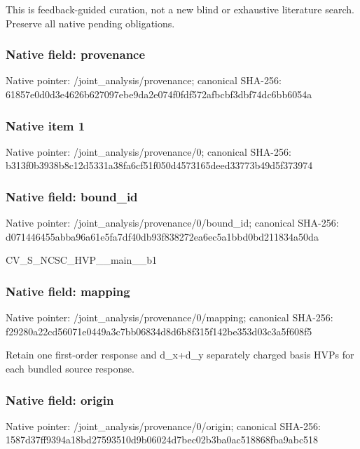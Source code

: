 \documentclass[10pt,a4paper]{article}
\begin{document}
\begingroup\raggedright\sloppy This is feedback-guided curation,\allowbreak{} not a new blind or exhaustive literature search. Preserve all native pending obligations.\par\endgroup

\subsubsection{Native field: provenance}
Native pointer: /joint\_\allowbreak{}analysis/provenance; canonical SHA-256: 61857e0d0d3e4626b627097ebe9da2e074f0fdf572afbcbf3dbf74dc6bb6054a

\subsubsection{Native item 1}
Native pointer: /joint\_\allowbreak{}analysis/provenance/0; canonical SHA-256: b313f0b3938b8c12d5331a38fa6cf51f050d4573165deed33773b49d5f373974

\subsubsection{Native field: bound\_\allowbreak{}id}
Native pointer: /joint\_\allowbreak{}analysis/provenance/0/bound\_\allowbreak{}id; canonical SHA-256: d071446455abba96a61e5fa7df40db93f838272ea6ec5a1bbd0bd211834a50da

\begingroup\raggedright\sloppy CV\_\allowbreak{}S\_\allowbreak{}NCSC\_\allowbreak{}HVP\_\allowbreak{}\_\allowbreak{}main\_\allowbreak{}\_\allowbreak{}b1\par\endgroup

\subsubsection{Native field: mapping}
Native pointer: /joint\_\allowbreak{}analysis/provenance/0/mapping; canonical SHA-256: f29280a22cd56071e0449a3c7bb06834d8d6b8f315f142be353d03c3a5f608f5

\begingroup\raggedright\sloppy Retain one first-order response and d\_\allowbreak{}x+d\_\allowbreak{}y separately charged basis HVPs for each bundled source response.\par\endgroup

\subsubsection{Native field: origin}
Native pointer: /joint\_\allowbreak{}analysis/provenance/0/origin; canonical SHA-256: 1587d37ff9394a18bd27593510d9b06024d7bec02b3ba0ac518868fba9abc518
\end{document}

